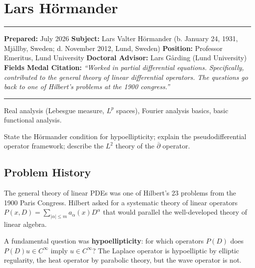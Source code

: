 \chapter{Lars Hörmander}\label{ch1962larshormander:lars-huxf6rmander-fields-medal-1962-a-comprehensive-report}

\begin{center}\rule{0.5\linewidth}{0.5pt}\end{center}

\textbf{Prepared:} July 2026
\textbf{Subject:} Lars Valter Hörmander (b. January 24, 1931, Mjällby, Sweden; d. November 2012, Lund, Sweden)
\textbf{Position:} Professor Emeritus, Lund University
\textbf{Doctoral Advisor:} Lars Gårding (Lund University)
\textbf{Fields Medal Citation:} \emph{``Worked in partial differential equations.
Specifically, contributed to the general theory of linear differential operators.
The questions go back to one of Hilbert's problems at the 1900 congress.''}

\begin{center}\rule{0.5\linewidth}{0.5pt}\end{center}

\begin{prereqs} Real analysis (Lebesgue measure, $L^p$ spaces), Fourier
analysis basics, basic functional analysis. \end{prereqs}

\begin{objectives} State the H\"{o}rmander condition for hypoellipticity; explain
the pseudodifferential operator framework; describe the $L^2$ theory of the
$\overline{\partial}$ operator. \end{objectives}

\section{Problem History}

The general theory of linear PDEs was one of Hilbert's 23 problems from the 1900
Paris Congress. Hilbert asked for a systematic theory of linear operators
$P(x, D) = \sum_{|\alpha| \leq m} a_\alpha(x) D^\alpha$ that would parallel the
well-developed theory of linear algebra.

A fundamental question was \textbf{hypoellipticity}: for which operators $P(D)$
does $P(D)u \in C^\infty$ imply $u \in C^\infty$? The Laplace operator is
hypoelliptic by elliptic regularity, the heat operator by parabolic theory, but
the wave operator is not.

